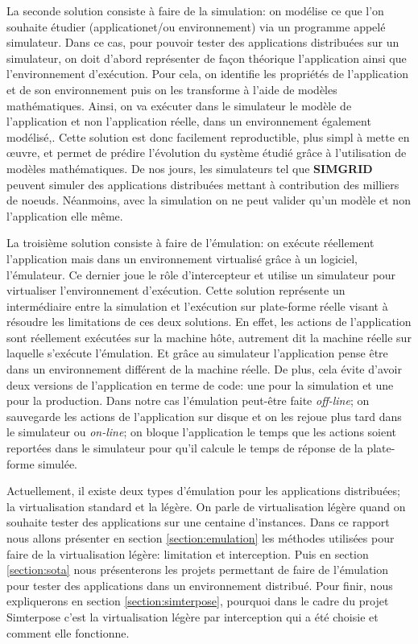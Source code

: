 La seconde solution consiste à faire de la simulation: on modélise ce que l'on
souhaite étudier (applicationet/ou environnement) via un programme appelé
simulateur. Dans ce cas, pour pouvoir tester des applications distribuées sur un
simulateur, on doit d'abord représenter de façon théorique l'application ainsi
que l'environnement d'exécution. Pour cela, on identifie les propriétés de
l'application et de son environnement puis on les transforme à l'aide de modèles
mathématiques. Ainsi, on va exécuter dans le simulateur le modèle de
l'application et non l'application réelle, dans un environnement également
modélisé,. Cette solution est donc facilement reproductible, plus simpl à mette
en \oe uvre, et permet de prédire l'évolution du système étudié grâce à
l'utilisation de modèles mathématiques. De nos jours, les simulateurs tel que
\textbf{SIMGRID}\citep{CASANOVA:SimGrid, MARTIN:SimGrid} peuvent simuler des
applications distribuées mettant à contribution des milliers de
noeuds. Néanmoins, avec la simulation on ne peut valider qu'un modèle et non
l'application elle même.

La troisième solution consiste à faire de l'émulation: on exécute réellement
l'application mais dans un environnement virtualisé grâce à un logiciel,
l'émulateur. Ce dernier joue le rôle d'intercepteur et utilise un simulateur
pour virtualiser l'environnement d'exécution.
Cette solution représente un intermédiaire entre la simulation et l'exécution
sur plate-forme réelle visant à résoudre les limitations de ces deux
solutions. En effet, les actions de l'application sont réellement exécutées sur
la machine hôte, autrement dit la machine réelle sur laquelle s'exécute
l'émulation. Et grâce au simulateur l'application pense être dans un
environnement différent de la machine réelle. De plus, cela évite d'avoir deux
versions de l'application en terme de code: une pour la simulation et une pour
la production. Dans notre cas l'émulation peut-être faite \textit{off-line}; on
sauvegarde les actions de l'application sur disque et on les rejoue plus tard
dans le simulateur ou \textit{on-line}; on bloque l'application le temps que les
actions soient reportées dans le simulateur pour qu'il calcule le temps de
réponse de la plate-forme simulée.

Actuellement, il existe deux types d'émulation pour les applications
distribuées; la virtualisation standard et la légère. On parle de virtualisation
légère quand on souhaite tester des applications sur une centaine
d'instances. Dans ce rapport nous allons présenter en section
\ref{section:emulation} les méthodes utilisées pour faire de la virtualisation
légère: limitation et interception. Puis en section \ref{section:sota} nous
présenterons les projets permettant de faire de l'émulation pour tester des
applications dans un environnement distribué. Pour finir, nous expliquerons en
section \ref{section:simterpose}, pourquoi dans le cadre du projet Simterpose
c'est la virtualisation légère par interception qui a été choisie et comment
elle fonctionne.
